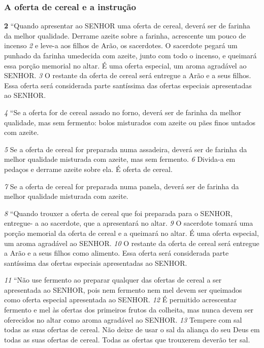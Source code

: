 \bigskip
\subsubsection*{A oferta de cereal e a instrução}
\textbf{\large 2} “Quando apresentar ao SENHOR uma oferta de cereal, deverá ser de farinha da
melhor qualidade. Derrame azeite sobre a farinha, acrescente um pouco de
incenso 
\textit{\tiny 2} 
e leve-a aos filhos de Arão, os sacerdotes. O sacerdote pegará um
punhado da farinha umedecida com azeite, junto com todo o incenso, e queimará
essa porção memorial no altar. É uma oferta especial, um aroma agradável ao
SENHOR. 
\textit{\tiny 3} 
O restante da oferta de cereal será entregue a Arão e a seus filhos. Essa
oferta será considerada parte santíssima das ofertas especiais apresentadas ao
SENHOR. 

\smallskip
\textit{\tiny 4} 
“Se a oferta for de cereal assado no forno, deverá ser de farinha da melhor
qualidade, mas sem fermento: bolos misturados com azeite ou pães finos untados
com azeite. 

\smallskip
\textit{\tiny 5} 
Se a oferta de cereal for preparada numa assadeira, deverá ser de
farinha da melhor qualidade misturada com azeite, mas sem fermento. 
\textit{\tiny 6} 
Divida-a
em pedaços e derrame azeite sobre ela. É oferta de cereal. 

\smallskip
\textit{\tiny 7} 
Se a oferta de cereal
for preparada numa panela, deverá ser de farinha da melhor qualidade misturada
com azeite. 

\smallskip
\textit{\tiny 8} 
“Quando trouxer a oferta de cereal que foi preparada para o SENHOR, entregue-
a ao sacerdote, que a apresentará no altar. 
\textit{\tiny 9} 
O sacerdote tomará uma porção
memorial da oferta de cereal e a queimará no altar. É uma oferta especial, um
aroma agradável ao SENHOR. 
\textit{\tiny 10}
O restante da oferta de cereal será entregue a Arão
e a seus filhos como alimento. Essa oferta será considerada parte santíssima das
ofertas especiais apresentadas ao SENHOR.
   
\smallskip
\textit{\tiny 11}
“Não use fermento ao preparar qualquer das ofertas de cereal a ser
apresentada ao SENHOR, pois nem fermento nem mel devem ser queimados como
oferta especial apresentada ao SENHOR. 
\textit{\tiny 12}
É permitido acrescentar fermento e mel
às ofertas dos primeiros frutos da colheita, mas nunca devem ser oferecidos no
altar como aroma agradável ao SENHOR. 
\textit{\tiny 13}
Tempere com sal todas as suas ofertas
de cereal. Não deixe de usar o sal da aliança do seu Deus em todas as suas ofertas
de cereal. Todas as ofertas que trouxerem deverão ter sal.

